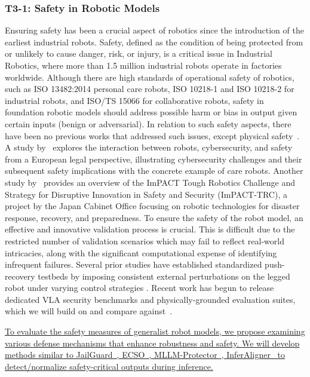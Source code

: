 \subsubsection{T3-1: Safety in Robotic Models} \label{sec:t3_1}
Ensuring safety has been a crucial aspect of robotics since the introduction of the earliest industrial robots.
Safety, defined as the condition of being protected from or unlikely to cause danger, risk, or injury, is a critical issue in Industrial Robotics, where more than 1.5 million industrial robots operate in factories worldwide.
Although there are high standards of operational safety of robotics, such as ISO 13482:2014 personal care robots, ISO 10218-1 and ISO 10218-2 for industrial robots, and ISO/TS 15066 for collaborative robots, safety in foundation robotic models should address possible harm or bias in output given certain inputs (benign or adversarial).
In relation to such safety aspects, there have been no previous works that addressed such issues, except physical safety~\cite{FoschVillaronga2015CreationOA,RePEc:eps:cepswp:26204,10.3389/frobt.2022.1002226}.
A study by~\cite{fosch21} explores the interaction between robots, cybersecurity, and safety from a European legal perspective, illustrating cybersecurity challenges and their subsequent safety implications with the concrete example of care robots.
Another study by~\cite{tadokoro19} provides an overview of the ImPACT Tough Robotics Challenge and Strategy for Disruptive Innovation in Safety and Security (ImPACT-TRC), a project by the Japan Cabinet Office focusing on robotic technologies for disaster response, recovery, and preparedness.
To ensure the safety of the robot model, an effective and innovative validation process is crucial. This is difficult due to the restricted number of validation scenarios which may fail to reflect real-world intricacies, along with the significant computational expense of identifying infrequent failures.
Several prior studies have established standardized push-recovery testbeds by imposing consistent external perturbations on the legged robot under varying control strategies \cite{zhangei2023quadruped-tro, weng2023standard-legged-test, weng2023comparability}.
Recent work has begun to release dedicated VLA security benchmarks and physically-grounded evaluation suites, which we will build on and compare against~\cite{li2025attackvla,sun2026maniparena}.

\ul{To evaluate the safety measures of generalist robot models, we propose examining various defense mechanisms that enhance robustness and safety. We will develop methods similar to JailGuard~}\cite{zhang2023mutation}\ul{, ECSO~}\cite{gou2024eyes}\ul{,  MLLM-Protector~}\cite{pi2024mllm}\ul{, InferAligner~}\cite{wang2024inferaligner}\ul{ to detect/normalize safety-critical outputs during inference.}


